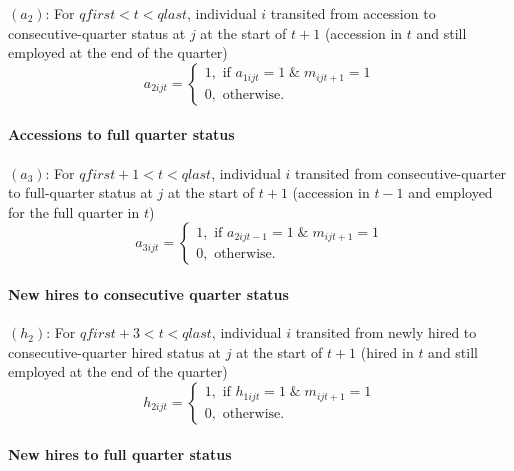 $\left( a_{2}\right) $: For $qfirst<t<qlast$, individual $i$ transited from
accession to consecutive-quarter status at $j$ at the start of $t+1$
(accession in $t$ and still employed at the end of the quarter)%
\begin{equation}
a_{2ijt}=\left\{ 
\begin{array}{l}
1,\text{ if }a_{1ijt}=1\;\&\;m_{ijt+1}=1 \\ 
0,\text{ otherwise.}%
\end{array}%
\right.  \label{eq:a2ijt}
\end{equation}

\paragraph{Accessions to full quarter status}

$\left( a_{3}\right) $: For $qfirst+1<t<qlast$, individual $i$ transited
from consecutive-quarter to full-quarter status at $j$ at the start of $t+1$
(accession in $t-1$ and employed for the full quarter in $t$)%
\begin{equation}
a_{3ijt}=\left\{ 
\begin{array}{l}
1,\text{ if }a_{2ijt-1}=1\;\&\;m_{ijt+1}=1 \\ 
0,\text{ otherwise.}%
\end{array}%
\right.  \label{eq:a3ijt}
\end{equation}

\paragraph{New hires to consecutive quarter status}

$\left( h_{2}\right) $: For $qfirst+3<t<qlast$, individual $i$ transited
from newly hired to consecutive-quarter hired status at $j$ at the start of $%
t+1$ (hired in $t$ and still employed at the end of the quarter)%
\begin{equation}
h_{2ijt}=\left\{ 
\begin{array}{l}
1,\text{ if }h_{1ijt}=1\;\&\;m_{ijt+1}=1 \\ 
0,\text{ otherwise.}%
\end{array}%
\right.  \label{eq:h2ijt}
\end{equation}

\paragraph{New hires to full quarter status}


